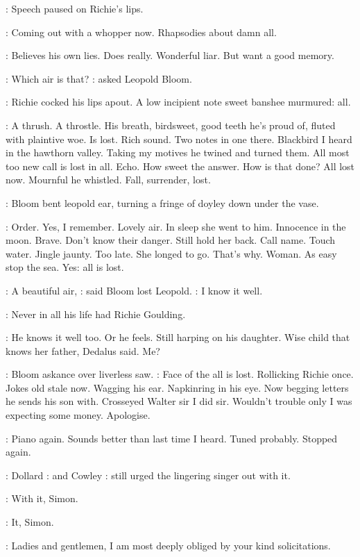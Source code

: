 :
Speech paused on Richie's lips.

\BloomInt:
Coming out with a whopper now.
Rhapsodies about damn all.

\BloomInt:
Believes his own lies.
Does really.
Wonderful liar.
But want a good memory.

\Bloom:
Which air is that?
:
asked Leopold Bloom.


:
Richie cocked his lips apout.
A low incipient note sweet banshee murmured:
all.

\BloomInt:
A thrush.
A throstle.
His breath,
birdsweet,
good teeth he's proud of,
fluted with plaintive woe.
Is lost.
Rich sound.
Two notes in one there.
Blackbird I heard in the hawthorn valley.
Taking my motives he twined and turned them.
All most too new call is lost in all.
Echo.
How sweet the answer.
How is that done?
All lost now.
Mournful he whistled.
Fall,
surrender,
lost.

:
Bloom bent leopold ear,
turning a fringe of doyley down under the vase.

\BloomInt:
Order.
Yes,
I remember.
Lovely air.
In sleep she went to him.
Innocence in the moon.
Brave.
Don't know their danger.
Still hold her back.
Call name.
Touch water.
Jingle jaunty.
Too late.
She longed to go.
That's why.
Woman.
As easy stop the sea.
Yes:
all is lost.

\Bloom:
A beautiful air,
:
said Bloom lost Leopold.
\Bloom:
I know it well.

:
Never in all his life had Richie Goulding.

\BloomInt:
He knows it well too.
Or he feels.
Still harping on his daughter.
Wise
child that knows her father,
Dedalus said.
Me?

:
Bloom askance over liverless saw.
\BloomInt:
Face of the all is lost.
Rollicking
Richie once.
Jokes old stale now.
Wagging his ear.
Napkinring in his eye.
Now begging letters he sends his son with.
Crosseyed Walter sir I did sir.
Wouldn't trouble only I was expecting some money.
Apologise.

\BloomInt:
Piano again.
Sounds better than last time I heard.
Tuned probably.
Stopped again.

:
Dollard
:
and Cowley
:
still urged the lingering singer out with it.

\dollard:
With it,
Simon.

\cowley:
It,
Simon.

\simon:
Ladies and gentlemen,
I am most deeply obliged by your kind
solicitations.

